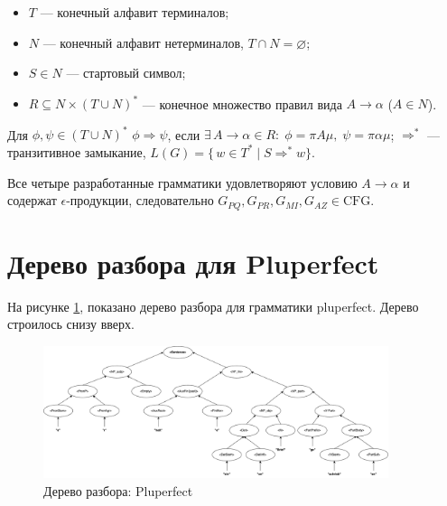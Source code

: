 \documentclass[areasetadvanced]{scrartcl}
\begin{document}
\begin{itemize}
  \item $T$ — конечный алфавит терминалов;
  \item $N$ — конечный алфавит нетерминалов, $T\cap N=\varnothing$;
  \item $S\in N$ — стартовый символ;
  \item $R\subseteq N\times(T\cup N)^{*}$ — конечное множество правил
        вида $A\to\alpha$ ($A\in N$).
\end{itemize}

Для $\phi,\psi\in(T\cup N)^{*}$\;
$\phi\Rightarrow\psi$, если  
$\exists\,A\to\alpha\in R:\;
  \phi=\pi A\mu,\;\psi=\pi\alpha\mu$;  
$\Rightarrow^{*}$ — транзитивное замыкание,  
$L(G)=\{\,w\in T^{*}\mid S\Rightarrow^{*}w\}$.

Все четыре разработанные грамматики удовлетворяют
условию $A\to\alpha$ и содержат $\epsilon$-продукции,
следовательно $G_{PQ},G_{PR},G_{MI},G_{AZ}\in\text{CFG}$.

\newpage
\section{Дерево разбора для Pluperfect} %
На рисунке \ref{fig:tree}, показано дерево разбора для грамматики pluperfect. Дерево строилось снизу вверх.
\begin{figure}[H]
	\centering
	\includegraphics[width=0.9\textwidth]{images/TreeFinal.png}
	\caption{Дерево разбора: Pluperfect}
	\label{fig:tree}
\end{figure}
\newpage
\end{document}
